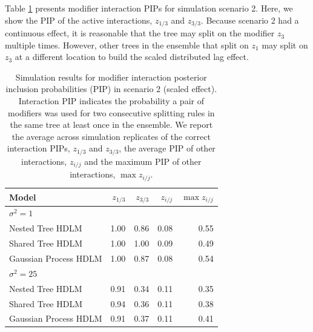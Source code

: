 \documentclass[12pt]{article}
\begin{document}
Table \ref{tab:scen2_inc} presents modifier interaction PIPs for simulation scenario 2. Here, we show the PIP of the active interactions, $z_{1/3}$ and $z_{3/3}$. Because scenario 2 had a continuous effect, it is reasonable that the tree may split on the modifier $z_3$ multiple times. However, other trees in the ensemble that split on $z_1$ may split on $z_3$ at a different location to build the scaled distributed lag effect.
\begin{table}[!ht]
\footnotesize
    \centering
    \caption{Simulation results for modifier interaction posterior inclusion probabilities (PIP) in scenario 2 (scaled effect). Interaction PIP indicates the probability a pair of modifiers was used for two consecutive splitting rules in the same tree at least once in the ensemble. We report the average across simulation replicates of the correct interaction PIPs, $z_{1/3}$ and $z_{3/3}$, the average PIP of other interactions, $z_{i/j}$ and the maximum PIP of other interactions, $\max z_{i/j}$.}\vspace{6pt}
    \label{tab:scen2_inc}
    \begin{tabular}{lrrrr}
        \toprule[2pt]
        Model & $z_{1/3}$ & $z_{3/3}$ & $z_{i/j}$ & $\max z_{i/j}$\\
        \midrule
        \multicolumn{5}{l}{$\sigma^2=1$}\\
Nested Tree HDLM & 1.00 & 0.86 & 0.08 & 0.55\\
Shared Tree HDLM & 1.00 & 1.00 & 0.09 & 0.49\\
Gaussian Process HDLM & 1.00 & 0.87 & 0.08 & 0.54\\
        
        

        \midrule
        \multicolumn{5}{l}{$\sigma^2=25$}\\
Nested Tree HDLM & 0.91 & 0.34 & 0.11 & 0.35\\
Shared Tree HDLM & 0.94 & 0.36 & 0.11 & 0.38\\
Gaussian Process HDLM & 0.91 & 0.37 & 0.11 & 0.41\\

        \bottomrule[2pt]
    \end{tabular}
\end{table}
\end{document}
